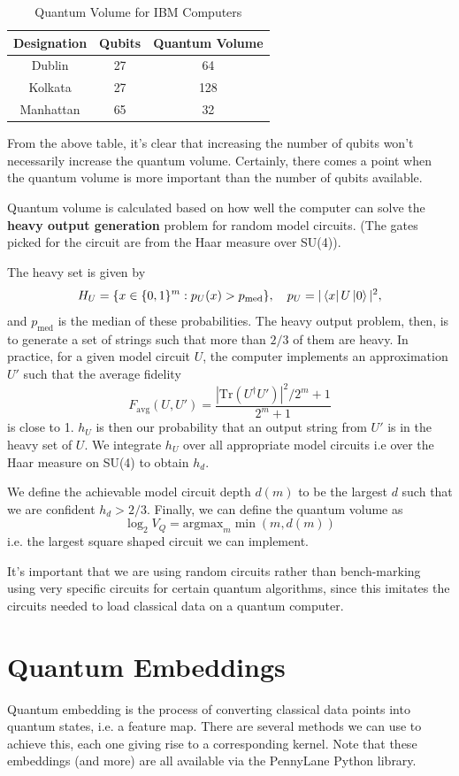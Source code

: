 \documentclass{article}
\theoremstyle{definition}
\begin{document}
\begin{table}[htb]
    \centering
    \begin{tabular}{ccc}
         Designation & Qubits & Quantum Volume  \\
        \hline
        Dublin & 27 & 64 \\
        Kolkata & 27 & 128 \\
        Manhattan & 65 & 32 
    \end{tabular}
    \caption{Quantum Volume for IBM Computers}
    \label{tab:quantum_volume_ibm}
\end{table}

From the above table, it's clear that increasing the number of qubits won't necessarily increase the quantum volume. Certainly, there comes a point when the quantum volume is more important than the number of qubits available.

Quantum volume is calculated based on how well the computer can solve the \textbf{heavy output generation} problem for random model circuits. (The gates picked for the circuit are from the Haar measure over SU(4)). 

The heavy set is given by
\[
H_U = \{ x \in \{0, 1\}^m : p_U (x) > p_{\text{med}} \}, \quad p_U = | \bra{x} U \ket{0} |^2,
\]
and $p_{\text{med}}$ is the median of these probabilities. The heavy output problem, then, is to generate a set of strings such that more than $2/3$ of them are heavy. In practice, for a given model circuit $U$, the computer implements an approximation $U'$ such that the average fidelity
\[
F_{\text{avg}} (U, U') = \frac{|\text{Tr} (U^\dagger U')|^2 / 2^m + 1}{2^m + 1}
\]
is close to 1. $h_U$ is then our probability that an output string from $U'$ is in the heavy set of $U$. We integrate $h_U$ over all appropriate model circuits i.e over the Haar measure on SU(4) to obtain $h_d$.

We define the achievable model circuit depth $d(m)$ to be the largest $d$ such that we are confident $h_d > 2/3$. Finally, we can define the quantum volume as
\[
\log_2 V_Q = \text{argmax}_m \min (m, d(m)) 
\]
i.e. the largest square shaped circuit we can implement. 

It's important that we are using random circuits rather than bench-marking using very specific circuits for certain quantum algorithms, since this imitates the circuits needed to load classical data on a quantum computer. 


\section{Quantum Embeddings}
Quantum embedding is the process of converting classical data points into quantum states, i.e. a feature map. There are several methods we can use to achieve this, each one giving rise to a corresponding kernel. Note that these embeddings (and more) are all available via the PennyLane Python library.
\end{document}
